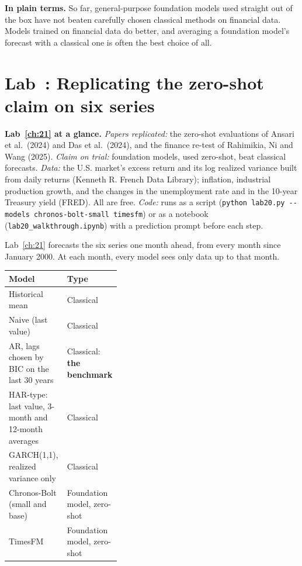 \noindent\textbf{In plain terms.} So far, general-purpose foundation models used straight out of the box have not beaten carefully chosen classical methods on financial data. Models trained on financial data do better, and averaging a foundation model's forecast with a classical one is often the best choice of all.

\section{Lab~\thechapter: Replicating the zero-shot claim on six series}
\label{sec:21-lab}

\begin{callout}
\textbf{Lab~\ref{ch:21} at a glance.} \emph{Papers replicated:} the zero-shot evaluations of Ansari et al.\ (2024) and Das et al.\ (2024), and the finance re-test of Rahimikia, Ni and Wang (2025). \emph{Claim on trial:} foundation models, used zero-shot, beat classical forecasts. \emph{Data:} the U.S. market's excess return and its log realized variance built from daily returns (Kenneth R. French Data Library); inflation, industrial production growth, and the changes in the unemployment rate and in the 10-year Treasury yield (FRED). All are free. \emph{Code:} runs as a script (\texttt{python lab20.py -{}-models chronos-bolt-small timesfm}) or as a notebook (\texttt{lab20\_walkthrough.ipynb}) with a prediction prompt before each step.
\end{callout}

Lab~\ref{ch:21} forecasts the six series one month ahead, from every month since January 2000. At each month, every model sees only data up to that month.

\begin{center}
\small
\begin{tabularx}{0.9\linewidth}{@{}>{\raggedright\arraybackslash}X>{\raggedright\arraybackslash}p{0.38\linewidth}@{}}
\toprule
Model & Type \\
\midrule
Historical mean & Classical \\
Naive (last value) & Classical \\
AR, lags chosen by BIC on the last 30 years & Classical: \textbf{the benchmark} \\
HAR-type: last value, 3-month and 12-month averages & Classical \\
GARCH(1,1), realized variance only & Classical \\
Chronos-Bolt (small and base) & Foundation model, zero-shot \\
TimesFM & Foundation model, zero-shot \\
\bottomrule
\end{tabularx}
\end{center}

